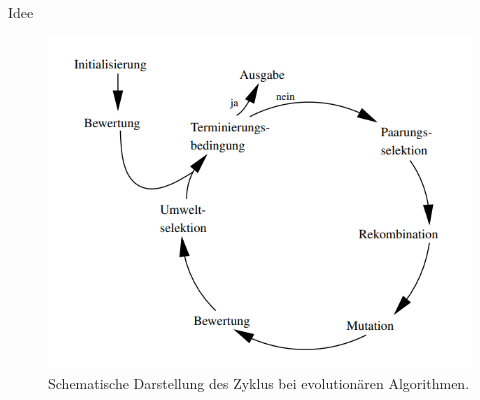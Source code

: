 \documentclass[10pt,table]{beamer}
\begin{document}
\begin{frame}{Idee}
    \begin{figure}[h]
        \centering
        \includegraphics[scale=0.4]{Images/evoscheme.png}
        \caption{Schematische Darstellung des Zyklus bei evolutionären Algorithmen.}
        \label{fig:evoscheme}
    \end{figure}
\end{frame}
\end{document}
